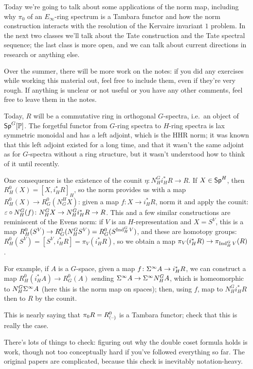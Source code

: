 Today we're going to talk about some applications of the norm map, including why $\pi_0$ of an $E_\infty$-ring
spectrum is a Tambara functor and how the norm construction interacts with the resolution of the Kervaire invariant
$1$ problem. In the next two classes we'll talk about the Tate construction and the Tate spectral sequence; the
last class is more open, and we can talk about current directions in research or anything else.

Over the summer, there will be more work on the notes: if you did any exercises while working this material out,
feel free to include them, even if they're very rough. If anything is unclear or not useful or you have any other
comments, feel free to leave them in the notes.

Today, $R$ will be a commutative ring in orthogonal $G$-spectra, i.e.\ an object of $\mathsf{Sp}^G[\mathbb P]$. The forgetful
functor from $G$-ring spectra to $H$-ring spectra is lax symmetric monoidal and has a left adjoint, which is the
HHR norm; it was known that this left adjoint existed for a long time, and that it wasn't the same adjoint as for
$G$-spectra without a ring structure, but it wasn't understood how to think of it until recently.

One consequence is the existence of the counit $\eta\colon N_H^Gi_H^*R\to R$. If $X\in\mathsf{Sp}^H$, then $R_H^0(X) = [X,
i_H^*R]_H$, so the norm provides us with a map $R_H^0(X)\to R_G^0(N_G^HX)$: given a map $f\colon X\to i_H^*R$,
norm it and apply the counit: $\varepsilon\circ N_H^G(f)\colon N_H^GX\to N_H^G i_H^*R\to R$. This and a few similar
constructions are reminiscent of the Evens norm: if $V$ is an $H$-representation and $X = S^V$, this is a map
$R_H^0(S^V)\to R_G^0(N_H^GS^V) = R_G^0(S^{\operatorname{Ind}_H^GV})$, and these are homotopy groups: $R_H^0(S^V) = [S^V, i_H^*R]
= \pi_V(i_H^*R)$, so we obtain a map $\pi_V(i_H^*R)\to\pi_{\operatorname{Ind}_H^GV}(R)$.

For example, if $A$ is a $G$-space, given a map $f\colon\Sigma^\infty A\to i_H^*R$, we can construct a map $R_H^0(i_H^*A)\to
R_G^0(A)$ sending $\Sigma^\infty A\to\Sigma^\infty N_H^G A$, which is homeomorphic to $N_H^G\Sigma^\infty A$ (here this is the norm map on
spaces); then, using $f$, map to $N_H^Gi_H^*R$ then to $R$ by the counit.
\begin{ex}
This is nearly saying that $\pi_0R = R_{(\text{--})}^0$ is a Tambara functor; check that this is really the case.
\end{ex}
There's lots of things to check: figuring out why the double coset formula holds is work, though not too
conceptually hard if you've followed everything so far. The original papers are complicated, because this check is
inevitably notation-heavy.


